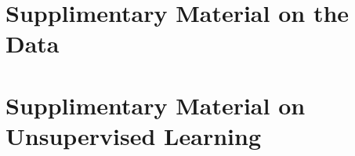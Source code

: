 \renewcommand{\imagepath}{../90-appendix/img}

\appendix

\chapter{Supplimentary Material on the Data}\label{ch:data_appendix}



\chapter{Supplimentary Material on Unsupervised Learning}\label{ch:unsupervised_appendix}
